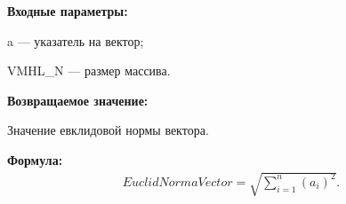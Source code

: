 \textbf{Входные параметры:}  

 a --- указатель на вектор;
 
 VMHL\_N ---  размер массива.
 
\textbf{Возвращаемое значение:}

 Значение евклидовой нормы вектора.

\textbf{Формула:}
\begin{eqnarray*}
EuclidNormaVector=\sqrt{\sum_{i=1}^{n} {\left( a_i\right)}^2 }.
\end{eqnarray*}